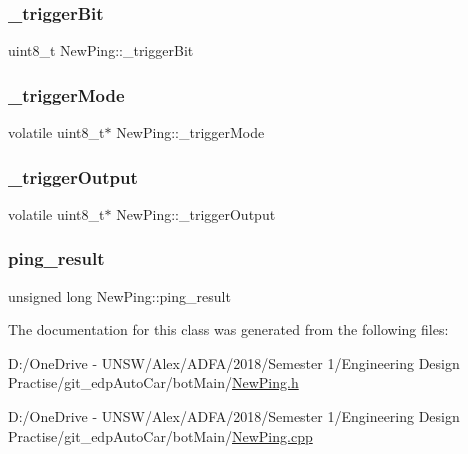 \subsubsection{\texorpdfstring{\+\_\+trigger\+Bit}{\_triggerBit}}
{\footnotesize\ttfamily uint8\+\_\+t New\+Ping\+::\+\_\+trigger\+Bit\hspace{0.3cm}{\ttfamily [private]}}

\mbox{\label{class_new_ping_adad3a763d59af120949a74e60a4ef9a5}} 
\subsubsection{\texorpdfstring{\+\_\+trigger\+Mode}{\_triggerMode}}
{\footnotesize\ttfamily volatile uint8\+\_\+t$\ast$ New\+Ping\+::\+\_\+trigger\+Mode\hspace{0.3cm}{\ttfamily [private]}}

\mbox{\label{class_new_ping_af0092b725d895673fb3d4c01e89992ed}} 
\subsubsection{\texorpdfstring{\+\_\+trigger\+Output}{\_triggerOutput}}
{\footnotesize\ttfamily volatile uint8\+\_\+t$\ast$ New\+Ping\+::\+\_\+trigger\+Output\hspace{0.3cm}{\ttfamily [private]}}

\mbox{\label{class_new_ping_a5d78ebdbffa4f42124ff7e06860503e6}} 
\subsubsection{\texorpdfstring{ping\+\_\+result}{ping\_result}}
{\footnotesize\ttfamily unsigned long New\+Ping\+::ping\+\_\+result}



The documentation for this class was generated from the following files\+:\begin{DoxyCompactItemize}
\item 
D\+:/\+One\+Drive -\/ U\+N\+S\+W/\+Alex/\+A\+D\+F\+A/2018/\+Semester 1/\+Engineering Design Practise/git\+\_\+edp\+Auto\+Car/bot\+Main/\mbox{\hyperlink{_new_ping_8h}{New\+Ping.\+h}}\item 
D\+:/\+One\+Drive -\/ U\+N\+S\+W/\+Alex/\+A\+D\+F\+A/2018/\+Semester 1/\+Engineering Design Practise/git\+\_\+edp\+Auto\+Car/bot\+Main/\mbox{\hyperlink{_new_ping_8cpp}{New\+Ping.\+cpp}}\end{DoxyCompactItemize}
